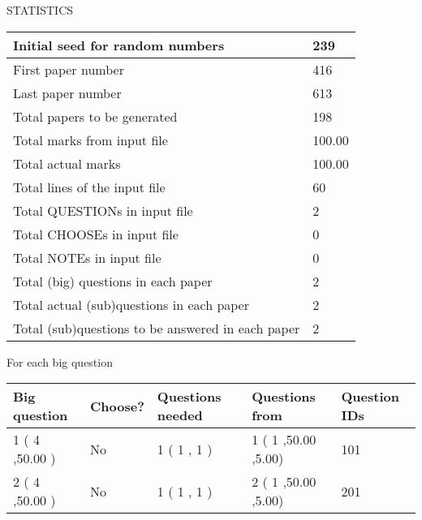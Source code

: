 \documentclass[12pt]{article}
\begin{document}
   
 \newpage
\setcounter{page}{1} 
   
   
 {\LARGE{STATISTICS}}
   
\vspace{0.2in}
   
 \begin{tabular}{|l|l|}
 \hline
 Initial seed for random numbers & 239  \\
\hline
 First paper number & 416  \\
\hline
 Last  paper number & 613  \\
\hline
 Total papers to be generated & 198  \\
\hline
Total marks from input file & 100.00 \\
\hline
Total actual marks & 100.00 \\
\hline
 Total lines of the input file & 60  \\
 \hline
 Total QUESTIONs in input file & 2  \\
\hline
 Total CHOOSEs in input file & 0  \\
\hline
 Total NOTEs in input file & 0  \\
\hline
 Total (big) questions in each paper & 2  \\
\hline
 Total actual (sub)questions in each paper & 2  \\
\hline
 Total (sub)questions to be answered in each paper & 2  \\
\hline
 \end{tabular}
   
   
 \newpage
   
{\LARGE{For each big question}}
   
   
\vspace{0.2in}
   
   
\noindent\hspace{-0.4in}\begin{tabular}{|l|l|l|l|l|}
\hline
 Big question & Choose? & Questions needed & Questions from & Question IDs \\ 
\hline
 1 ( 4 ,50.00
 ) &  No   & 
 1 ( 1 ,  1 ) &  1 ( 1
,50.00
 ,5.00) &  101  \\
 \hline
 2 ( 4 ,50.00
 ) &  No   & 
 1 ( 1 ,  1 ) &  2 ( 1
,50.00
 ,5.00) &  201  \\
 \hline
 \end{tabular}
 
 
\end{document}
